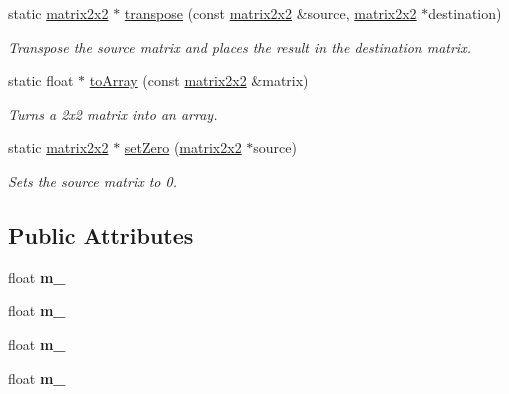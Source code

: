 \begin{DoxyCompactItemize}
static \hyperlink{classflounder_1_1matrix2x2}{matrix2x2} $\ast$ \hyperlink{classflounder_1_1matrix2x2_a8b4dbfda6db7b4a471553be7b45d1064}{transpose} (const \hyperlink{classflounder_1_1matrix2x2}{matrix2x2} \&source, \hyperlink{classflounder_1_1matrix2x2}{matrix2x2} $\ast$destination)
\begin{DoxyCompactList}\small\item\em Transpose the source matrix and places the result in the destination matrix. \end{DoxyCompactList}\item 
static float $\ast$ \hyperlink{classflounder_1_1matrix2x2_a8da6f8c235a0cd3715b037ac615a6e69}{to\+Array} (const \hyperlink{classflounder_1_1matrix2x2}{matrix2x2} \&matrix)
\begin{DoxyCompactList}\small\item\em Turns a 2x2 matrix into an array. \end{DoxyCompactList}\item 
static \hyperlink{classflounder_1_1matrix2x2}{matrix2x2} $\ast$ \hyperlink{classflounder_1_1matrix2x2_af3c4426514b430d36cd8c79e029d53ed}{set\+Zero} (\hyperlink{classflounder_1_1matrix2x2}{matrix2x2} $\ast$source)
\begin{DoxyCompactList}\small\item\em Sets the source matrix to 0. \end{DoxyCompactList}\end{DoxyCompactItemize}
\subsection*{Public Attributes}
\begin{DoxyCompactItemize}
\item 
\mbox{\label{classflounder_1_1matrix2x2_aab6a5557d4d69d52b5e91a758293bc34}} 
float {\bfseries m\+\_}
\item 
\mbox{\label{classflounder_1_1matrix2x2_a062f1440bd02a23ae0a0479154115c13}} 
float {\bfseries m\+\_}
\item 
\mbox{\label{classflounder_1_1matrix2x2_aa3fc31dd15899d1311ca1fda61ceb74c}} 
float {\bfseries m\+\_}
\item 
\mbox{\label{classflounder_1_1matrix2x2_a7dc48185b9002fe08bd8c1ba1ca4cadf}} 
float {\bfseries m\+\_}
\end{DoxyCompactItemize}


